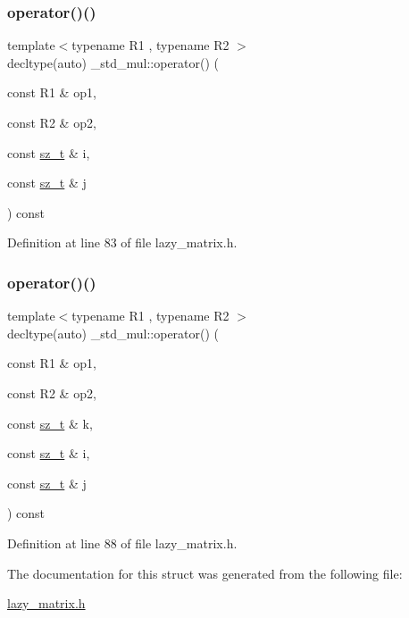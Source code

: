 \subsubsection{\texorpdfstring{operator()()}{operator()()}\hspace{0.1cm}{\footnotesize\ttfamily [1/2]}}
{\footnotesize\ttfamily template$<$typename R1 , typename R2 $>$ \\
decltype(auto) \+\_\+std\+\_\+mul\+::operator() (\begin{DoxyParamCaption}\item[{const R1 \&}]{op1,  }\item[{const R2 \&}]{op2,  }\item[{const \mbox{\hyperlink{lazy__matrix_8h_acba2745dcfc55b2d05ff45adc6a0a015}{sz\+\_\+t}} \&}]{i,  }\item[{const \mbox{\hyperlink{lazy__matrix_8h_acba2745dcfc55b2d05ff45adc6a0a015}{sz\+\_\+t}} \&}]{j }\end{DoxyParamCaption}) const\hspace{0.3cm}{\ttfamily [inline]}}



Definition at line 83 of file lazy\+\_\+matrix.\+h.

\mbox{\label{struct__std__mul_a7042dcb453b74c4e3fa1c70179c38043}} 
\subsubsection{\texorpdfstring{operator()()}{operator()()}\hspace{0.1cm}{\footnotesize\ttfamily [2/2]}}
{\footnotesize\ttfamily template$<$typename R1 , typename R2 $>$ \\
decltype(auto) \+\_\+std\+\_\+mul\+::operator() (\begin{DoxyParamCaption}\item[{const R1 \&}]{op1,  }\item[{const R2 \&}]{op2,  }\item[{const \mbox{\hyperlink{lazy__matrix_8h_acba2745dcfc55b2d05ff45adc6a0a015}{sz\+\_\+t}} \&}]{k,  }\item[{const \mbox{\hyperlink{lazy__matrix_8h_acba2745dcfc55b2d05ff45adc6a0a015}{sz\+\_\+t}} \&}]{i,  }\item[{const \mbox{\hyperlink{lazy__matrix_8h_acba2745dcfc55b2d05ff45adc6a0a015}{sz\+\_\+t}} \&}]{j }\end{DoxyParamCaption}) const\hspace{0.3cm}{\ttfamily [inline]}}



Definition at line 88 of file lazy\+\_\+matrix.\+h.



The documentation for this struct was generated from the following file\+:\begin{DoxyCompactItemize}
\item 
\mbox{\hyperlink{lazy__matrix_8h}{lazy\+\_\+matrix.\+h}}\end{DoxyCompactItemize}
